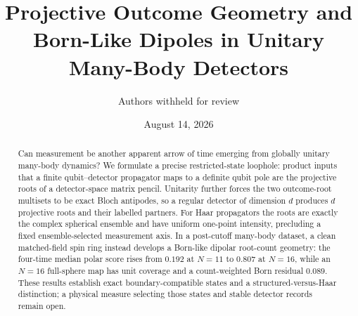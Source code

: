 \documentclass[aps,prl,reprint,superscriptaddress,nofootinbib]{revtex4-2}
\begin{document}
\title{Projective Outcome Geometry and Born-Like Dipoles in Unitary Many-Body Detectors}
\author{Authors withheld for review}
\date{August 14, 2026}

\begin{abstract}
Can measurement be another apparent arrow of time emerging from globally unitary many-body dynamics?  We formulate a precise restricted-state loophole: product inputs that a finite qubit--detector propagator maps to a definite qubit pole are the projective roots of a detector-space matrix pencil.  Unitarity further forces the two outcome-root multisets to be exact Bloch antipodes, so a regular detector of dimension $d$ produces $d$ projective roots and their labelled partners.  For Haar propagators the roots are exactly the complex spherical ensemble and have uniform one-point intensity, precluding a fixed ensemble-selected measurement axis.  In a post-cutoff many-body dataset, a clean matched-field spin ring instead develops a Born-like dipolar root-count geometry: the four-time median polar score rises from $0.192$ at $N=11$ to $0.807$ at $N=16$, while an $N=16$ full-sphere map has unit coverage and a count-weighted Born residual $0.089$.  These results establish exact boundary-compatible states and a structured-versus-Haar distinction; a physical measure selecting those states and stable detector records remain open.
\end{abstract}
\maketitle
\end{document}
